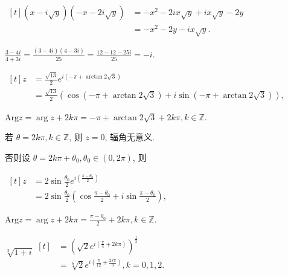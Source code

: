 \documentclass{homework}
\begin{document}
\maketitle

\(\begin{aligned}[t](x-i\sqrt{y})(-x-2i\sqrt{y})&=-x^2-2ix\sqrt{y}+ix\sqrt{y}-2y\\&=-x^2-2y-ix\sqrt{y}.\end{aligned}\)

\(\frac{3-4i}{4+3i}=\frac{(3-4i)(4-3i)}{25}=\frac{12-12-25i}{25}=-i.\)


\(\begin{aligned}[t]z&=\frac{\sqrt{13}}{2}e^{i(-\pi+\arctan{2}\sqrt{3})}\\&=\frac{\sqrt{13}}{2}(\cos(-\pi+\arctan{2}\sqrt{3})+i\sin(-\pi+\arctan{2}\sqrt{3})),\end{aligned}\)

\(\mathrm{Arg} z=\arg z+2k\pi=-\pi+\arctan{2}\sqrt{3}+2k\pi, k\in\mathbb{Z}\).

若 \(\theta=2k\pi, k\in\mathbb{Z}\), 则 \(z=0\), 辐角无意义.

否则设 \(\theta=2k\pi+\theta_0, \theta_0\in(0, 2\pi)\), 则

\(\begin{aligned}[t]z&=2\sin\frac{\theta_0}{2}e^{i(\frac{\pi-\theta_0}{2})}\\&=2\sin\frac{\theta_0}{2}(\cos\frac{\pi-\theta_0}{2}+i\sin\frac{\pi-\theta_0}{2}),\end{aligned}\)

\(\mathrm{Arg} z=\arg z+2k\pi=\frac{\pi-\theta_0}{2}+2k\pi, k\in\mathbb{Z}\).


\(\sqrt[3]{1+i}\begin{aligned}[t]&=\left(\sqrt{2}e^{i(\frac{\pi}{4}+2k\pi)}\right)^{\frac{1}{3}}\\&=\sqrt[6]{2}e^{i(\frac{\pi}{12}+\frac{2k\pi}{3})}, k=0,1,2.\end{aligned}\)
\end{document}
